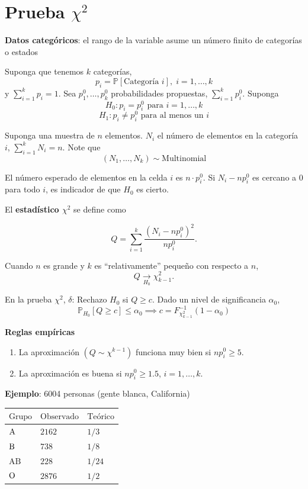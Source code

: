 \documentclass[
  12pt,
]{book}
\begin{document}
\hypertarget{prueba-chi2}{%
\section{\texorpdfstring{Prueba \(\chi^2\)}{Prueba \textbackslash chi\^{}2}}\label{prueba-chi2}}

\textbf{Datos categóricos}: el rango de la variable asume un número finito de categorías o estados

Suponga que tenemos \(k\) categorías,
\[p_i = \mathbb P[\text{Categoría }i],\;i=1,\dotsc,k\]
y \(\sum_{i=1}^kp_i = 1\). Sea \(p_1^0,\dotsc,p_k^0\) probabilidades propuestas, \(\sum_{i=1}^kp_i^0\). Suponga
\[ H_0: p_i = p_i^0\text{ para } i=1,\dots,k\]
\[ H_1: p_i \ne p_i^0\text{ para al menos un }i\]

Suponga una muestra de \(n\) elementos. \(N_i\) el número de elementos en la categoría \(i\), \(\sum _{i=1}^kN_i = n\). Note que
\[(N_1,\dots,N_k)\sim\text{Multinomial}\]

El número esperado de elementos en la celda \(i\) es \(n\cdot p_i^0\). Si \(N_i -np_i^0\) es cercano a 0 para todo \(i\), es indicador de que \(H_0\) es cierto.

El \textbf{estadístico \(\chi^2\)} se define como

\[Q = \sum_{i=1}^k\dfrac{(N_i-np_i^0)^2}{np_i^0}.\]

Cuando \(n\) es grande y \(k\) es ``relativamente'' pequeño con respecto a \(n\),
\[Q \xrightarrow[H_0]{}\chi^2_{k-1}.\]

En la prueba \(\chi^2\), \(\delta\): Rechazo \(H_0\) si \(Q\geq c\). Dado un nivel de significancia \(\alpha_0\),
\[\mathbb P_{H_0}[Q\geq c]\le \alpha_0\implies c = F^{-1}_{\chi^2_{k-1}}(1-\alpha_0)\]

\textbf{Reglas empíricas}

\begin{enumerate}
\def\labelenumi{\arabic{enumi}.}
\item
  La aproximación \((Q\sim\chi^{k-1})\) funciona muy bien si \(np_i^0\ge 5\).
\item
  La aproximación es buena si \(np_i^0\ge 1.5\), \(i=1,\dots,k\).
\end{enumerate}

\textbf{Ejemplo}: 6004 personas (gente blanca, California)

\begin{longtable}[]{@{}lll@{}}
\toprule
\(\text{Grupo}\) & \(\text{Observado}\) & \(\text{Teórico}\)\tabularnewline
\midrule
\endhead
\(\text A\) & \(2162\) & \(1/3\)\tabularnewline
\(\text B\) & \(738\) & \(1/8\)\tabularnewline
\(\text {AB}\) & \(228\) & \(1/24\)\tabularnewline
\(\text O\) & \(2876\) & \(1/2\)\tabularnewline
\bottomrule
\end{longtable}
\end{document}
